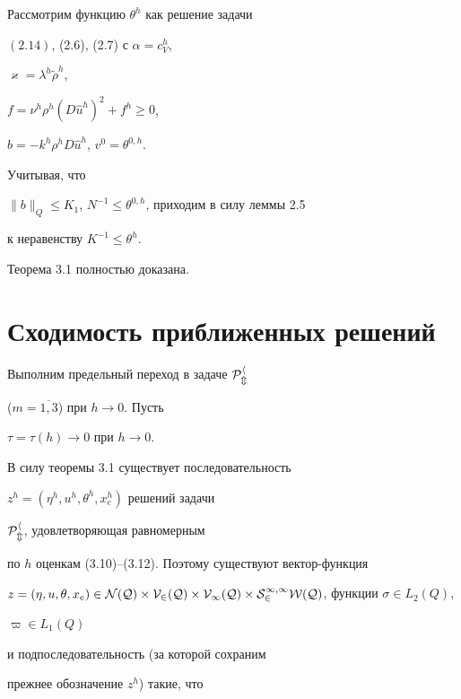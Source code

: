 \documentclass[12pt]{article}
\theoremstyle{plain} %
\theoremstyle{definition}
\numberwithin{equation}{section}
\begin{document}
\begin{pf} Рассмотрим функцию $\theta^h$ как решение задачи


$(2.14)$, (2.6), (2.7) с $\alpha= c^h_V$,


$\varkappa=\lambda^h\widetilde\rho^h$,


$f=\nu^h\rho^h(D\widehat u^h)^2+f^h\ge 0$,


$b=-k^h\rho^h D\widehat u^h$, $v^0=\theta^{0,h}$.


Учитывая, что


$\|b\|_Q\le K_1$, $N^{-1}\le\theta^{0,h}$, приходим в силу леммы 2.5


к неравенству $K^{-1}\le\theta^h$.


Теорема 3.1 полностью доказана.


\end{pf}





\section{Сходимость приближенных решений}





Выполним предельный переход в задаче $\cal P^h_m$


($m=\overline{1,3}$) при $h\to 0$. Пусть


$\tau=\tau(h)\to 0$ при $h\to 0$.





В силу теоремы 3.1 существует последовательность


$z^h = (\eta^h, u^h,\theta^h, x_e^h)$ решений задачи


$\cal P^h_m$, удовлетворяющая равномерным


по $h$ оценкам (3.10)--(3.12). Поэтому существуют вектор-функция


$z=(\eta,u,\theta,x_e)\in\cal N(Q)\times V_2(Q)


\times V_1(Q)\times S_2^{1,1}W(Q)$, функции $\sigma\in L_2(Q)$,


$\varpi\in L_1(Q)$


и подпоследовательность (за которой сохраним


прежнее обозначение $z^h$) такие, что
\end{document}
